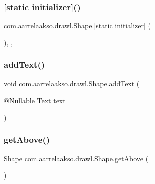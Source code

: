 \subsubsection{\texorpdfstring{[static initializer]()}{[static initializer]()}}
{\footnotesize\ttfamily com.\+aarrelaakso.\+drawl.\+Shape.\mbox{[}static initializer\mbox{]} (\begin{DoxyParamCaption}{ }\end{DoxyParamCaption})\hspace{0.3cm}{\ttfamily [static]}, {\ttfamily [package]}, {\ttfamily [inherited]}}

\mbox{\label{classcom_1_1aarrelaakso_1_1drawl_1_1_shape_a9784264f6abcf623b2774d6ef2a53fdc}} 
\subsubsection{\texorpdfstring{add\+Text()}{addText()}}
{\footnotesize\ttfamily void com.\+aarrelaakso.\+drawl.\+Shape.\+add\+Text (\begin{DoxyParamCaption}\item[{@Nullable \hyperlink{classcom_1_1aarrelaakso_1_1drawl_1_1_text}{Text}}]{text }\end{DoxyParamCaption})\hspace{0.3cm}{\ttfamily [inherited]}}

\mbox{\label{classcom_1_1aarrelaakso_1_1drawl_1_1_shape_acebea2aa57031322323c9bf50ee447db}} 
\subsubsection{\texorpdfstring{get\+Above()}{getAbove()}}
{\footnotesize\ttfamily \hyperlink{classcom_1_1aarrelaakso_1_1drawl_1_1_shape}{Shape} com.\+aarrelaakso.\+drawl.\+Shape.\+get\+Above (\begin{DoxyParamCaption}{ }\end{DoxyParamCaption})\hspace{0.3cm}{\ttfamily [inherited]}}



